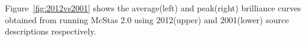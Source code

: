 \documentclass{elsarticle}
\begin{document}
Figure~\ref{fig:2012vs2001} shows the average(left) and peak(right) brilliance curves obtained from running McStas 2.0 using 2012(upper) and 2001(lower) source descriptions respectively.

















\end{document}
